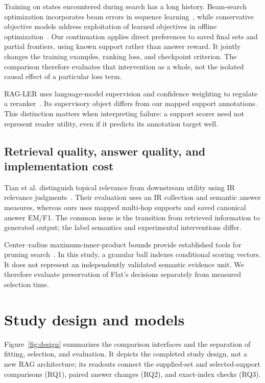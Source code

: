 \documentclass[preprint,12pt]{elsarticle}
\begin{document}
Training on states encountered during search has a long history. Beam-search optimization incorporates beam errors in sequence learning~\cite{wiseman2016bso}, while conservative objective models address exploitation of learned objectives in offline optimization~\cite{trabucco2021com}. Our continuation applies direct preferences to saved final sets and partial frontiers, using known support rather than answer reward. It jointly changes the training examples, ranking loss, and checkpoint criterion. The comparison therefore evaluates that intervention as a whole, not the isolated causal effect of a particular loss term.

RAG-LER uses language-model supervision and confidence weighting to regulate a reranker~\cite{zhai2025ragler}. Its supervisory object differs from our mapped support annotations. This distinction matters when interpreting failure: a support scorer need not represent reader utility, even if it predicts its annotation target well.

\subsection{Retrieval quality, answer quality, and implementation cost}
Tian et al. distinguish topical relevance from downstream utility using IR relevance judgments~\cite{tian2025relevance}. Their evaluation uses an IR collection and semantic answer measures, whereas ours uses mapped multi-hop supports and saved canonical answer EM/F1. The common issue is the transition from retrieved information to generated output; the label semantics and experimental interventions differ.

Center--radius maximum-inner-product bounds provide established tools for pruning search~\cite{ram2012tree}. In this study, a granular ball indexes conditional scoring vectors. It does not represent an independently validated semantic evidence unit. We therefore evaluate preservation of Flat's decisions separately from measured selection time.

\section{Study design and models}
Figure~\ref{fig:design} summarizes the comparison interfaces and the separation of fitting, selection, and evaluation. It depicts the completed study design, not a new RAG architecture; its readouts connect the supplied-set and selected-support comparisons (RQ1), paired answer changes (RQ2), and exact-index checks (RQ3).
\end{document}
